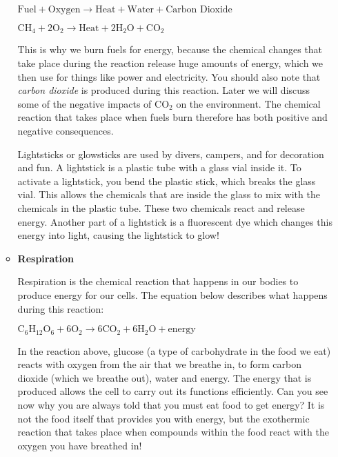 \begin{enumerate}
\begin{itemize}
    \begin{center}
      $\text{Fuel} + \text{Oxygen} \rightarrow \text{Heat} + \text{Water} + \text{Carbon Dioxide}$

      $\text{CH}_{4} + 2\text{O}_{2} \rightarrow \text{Heat} + 2\text{H}_{2}\text{O} + \text{CO}_{2}$
    \end{center}

    This is why we burn fuels for energy, because the chemical changes
    that take place during the reaction release huge amounts of
    energy, which we then use for things like power and
    electricity. You should also note that \textit{carbon dioxide} is
    produced during this reaction. Later we will discuss some of the
    negative impacts of CO$_2$ on the environment. The chemical
    reaction that takes place when fuels burn therefore has both
    positive and negative consequences.

    \begin{IFact}{
        Lightsticks or glowsticks are used by divers, campers, and for
        decoration and fun. A lightstick is a plastic tube with a
        glass vial inside it. To activate a lightstick, you bend the
        plastic stick, which breaks the glass vial. This allows the
        chemicals that are inside the glass to mix with the chemicals
        in the plastic tube. These two chemicals react and release
        energy. Another part of a lightstick is a fluorescent dye
        which changes this energy into light, causing the lightstick
        to glow!
      }
    \end{IFact}

  \item \textbf{Respiration}

    Respiration is the chemical reaction that happens in our bodies to
    produce energy for our cells. The equation below describes what
    happens during this reaction:

    \begin{center}
      $\text{C}_6\text{H}_{12}\text{O}_{6} + 6\text{O}_{2} \rightarrow 6\text{CO}_{2} + 6\text{H}_{2}\text{O} + \text{energy}$
    \end{center}

    In the reaction above, glucose (a type of carbohydrate in the food
    we eat) reacts with oxygen from the air that we breathe in, to
    form carbon dioxide (which we breathe out), water and energy. The
    energy that is produced allows the cell to carry out its functions
    efficiently. Can you see now why you are always told that you must
    eat food to get energy? It is not the food itself that provides
    you with energy, but the exothermic reaction that takes place when
    compounds within the food react with the oxygen you have breathed
    in!
  \end{itemize}
\end{enumerate}

